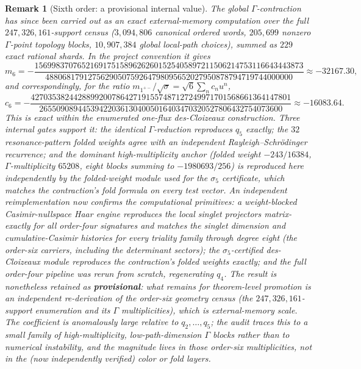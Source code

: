 \documentclass[11pt]{article}
\newtheorem{remark}[theorem]{Remark}
\begin{document}
\begin{remark}[Sixth order: a provisional internal value]
The global $\Gamma$-contraction has since been carried out as an exact
external-memory computation over the full $247{,}326{,}161$-support census
($3{,}094{,}806$ canonical ordered words, $205{,}699$ nonzero $\Gamma$-point
topology blocks, $10{,}907{,}384$ global local-path choices), summed as $229$
exact rational shards. In the project convention it gives
\[
m_6=-\frac{156998370765216917515896262601525405897211506214753116643443873}
{4880681791275629050759264798095652027950878794719744000000}
\approx-32167.30,
\]
and correspondingly, for the ratio $m_{1^{+-}}/\sqrt\sigma=\sqrt6\sum_n c_nu^n$,
\[
c_6=-\frac{4270353824428899200786427191557487127249971701568661364147801}
{265509089445394220361304005016403470320527806432754073600}\approx-16083.64 .
\]
This is exact \emph{within the enumerated one-flux des-Cloizeaux construction}.
Three internal gates support it: the identical $\Gamma$-reduction reproduces
$q_5$ exactly; the $32$ resonance-pattern folded weights agree with an
independent Rayleigh--Schr\"odinger recurrence; and the dominant
high-multiplicity anchor (folded weight $-243/16384$, $\Gamma$-multiplicity
$65208$, eight blocks summing to $-1980693/256$) is reproduced here independently
by the folded-weight module used for the $\sigma_5$ certificate, which matches the
contraction's fold formula on every test vector. An independent reimplementation now confirms the computational primitives:
a weight-blocked Casimir-nullspace Haar engine reproduces the local singlet
projectors \emph{matrix-exactly} for all order-four signatures and matches the
singlet dimension and cumulative-Casimir histories for every triality family
through degree eight (the order-six carriers, including the determinant sectors);
the $\sigma_5$-certified des-Cloizeaux module reproduces the contraction's folded
weights exactly; and the full order-four pipeline was rerun from scratch,
regenerating $q_4$. The result is nonetheless retained as \textbf{provisional}:
what remains for theorem-level promotion is an independent re-derivation of the
order-six \emph{geometry census} (the $247{,}326{,}161$-support enumeration and its
$\Gamma$ multiplicities), which is external-memory scale. The coefficient is
anomalously large relative to $q_2,\dots,q_5$; the audit traces this to a small
family of high-multiplicity, low-path-dimension $\Gamma$ blocks rather than to
numerical instability, and the magnitude lives in those order-six multiplicities,
not in the (now independently verified) color or fold layers.
\end{remark}
\end{document}
